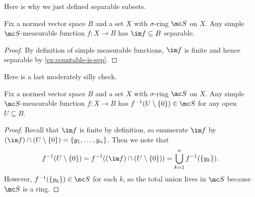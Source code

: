 \documentclass[../notes.tex]{subfiles}
\begin{document}
Here is why we just defined separable subsets.
\begin{lemma} \label{lem:simple-has-sep-image}
	Fix a normed vector space $B$ and a set $X$ with $\sigma$-ring $\mc S$ on $X$. Any simple $\mc S$-measurable function $f\colon X\to B$ has $\im f\subseteq B$ separable.
\end{lemma}
\begin{proof}
	By definition of simple measurable functions, $\im f$ is finite and hence separable by \autoref{ex:countable-is-sep}.
\end{proof}
Here is a last moderately silly check.
\begin{lemma} \label{lem:simple-measurable-pre-image}
	Fix a normed vector space $B$ and a set $X$ with $\sigma$-ring $\mc S$ on $X$. Any simple $\mc S$-measurable function $f\colon X\to B$ has $f^{-1}(U\setminus\{0\})\in\mc S$ for any open $U\subseteq B$.
\end{lemma}
\begin{proof}
	Recall that $\im f$ is finite by definition, so enumerate $\im f$ by $(\im f)\cap(U\setminus\{0\})=\{y_1,\ldots,y_n\}$. Then we note that
	\[f^{-1}(U\setminus\{0\})=f^{-1}((\im f)\cap(U\setminus\{0\}))=\bigcup_{k=1}^nf^{-1}(\{y_k\}).\]
	However, $f^{-1}(\{y_k\})\in\mc S$ for each $k$, so the total union lives in $\mc S$ because $\mc S$ is a ring.
\end{proof}
\end{document}
